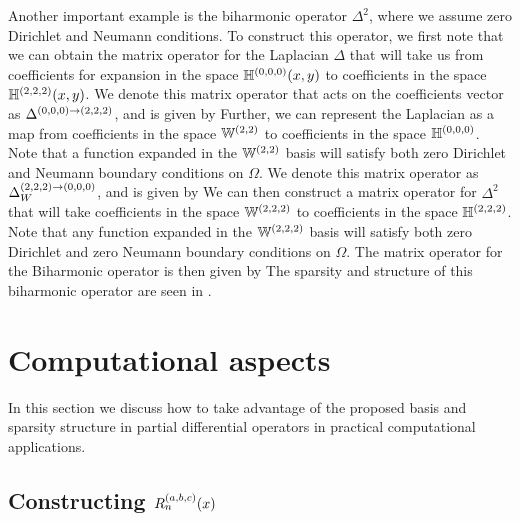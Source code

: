 Another important example is the biharmonic operator  $\Delta^2$, where we assume zero Dirichlet and Neumann conditions. To construct this operator, we first note that we can obtain the matrix operator for the Laplacian $\Delta$ that will take us from coefficients for expansion in the space ${\mathbb{H}^{(0,0,0)}}(x,y)$ to coefficients in the space $\mathbb{H}^{(2,2,2)}(x,y)$. We denote this matrix operator that acts on the coefficients vector as $\Delta^{(0,0,0)\to(2,2,2)}$, and is given by
Further, we can represent the Laplacian as a map from coefficients in the space $\mathbb{W}^{(2,2)}$ to coefficients in the space ${\mathbb{H}^{(0,0,0)}}$. Note that a function expanded in the $\mathbb{W}^{(2,2)}$ basis will satisfy both zero Dirichlet and Neumann boundary conditions on $\Omega$. We denote this matrix operator as $\Delta_W^{(2,2,2)\to(0,0,0)}$, and is given by
We can then construct a matrix operator for $\Delta^2$ that will take coefficients in the space $\mathbb{W}^{(2,2,2)}$ to coefficients in the space $\mathbb{H}^{(2,2,2)}$. Note that any function expanded in the $\mathbb{W}^{(2,2,2)}$ basis will satisfy both zero Dirichlet and zero Neumann boundary conditions on $\Omega$. The matrix operator for the Biharmonic operator is then given by
The sparsity and structure of this biharmonic operator are seen in .



\section{Computational aspects}\label{Section:Computation}

In this section we discuss how to take advantage of the proposed basis and sparsity structure in partial differential operators in practical computational applications.

\subsection{Constructing $R_n^{(a,b,c)}(x)$}



